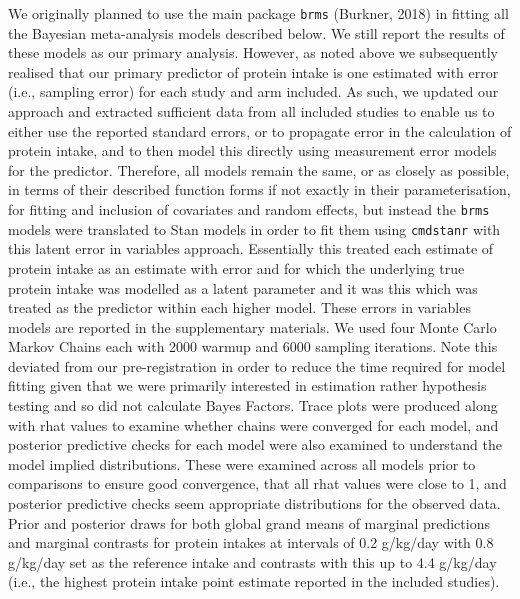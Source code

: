 \documentclass[
]{article}
\begin{document}
We originally planned to use the main package \texttt{brms} (Burkner,
2018) in fitting all the Bayesian meta-analysis models described below.
We still report the results of these models as our primary analysis.
However, as noted above we subsequently realised that our primary
predictor of protein intake is one estimated with error (i.e., sampling
error) for each study and arm included. As such, we updated our approach
and extracted sufficient data from all included studies to enable us to
either use the reported standard errors, or to propagate error in the
calculation of protein intake, and to then model this directly using
measurement error models for the predictor. Therefore, all models remain
the same, or as closely as possible, in terms of their described
function forms if not exactly in their parameterisation, for fitting and
inclusion of covariates and random effects, but instead the
\texttt{brms} models were translated to Stan models in order to fit them
using \texttt{cmdstanr} with this latent error in variables approach.
Essentially this treated each estimate of protein intake as an estimate
with error and for which the underlying true protein intake was modelled
as a latent parameter and it was this which was treated as the predictor
within each higher model. These errors in variables models are reported
in the supplementary materials. We used four Monte Carlo Markov Chains
each with 2000 warmup and 6000 sampling iterations. Note this deviated
from our pre-registration in order to reduce the time required for model
fitting given that we were primarily interested in estimation rather
hypothesis testing and so did not calculate Bayes Factors. Trace plots
were produced along with rhat values to examine whether chains were
converged for each model, and posterior predictive checks for each model
were also examined to understand the model implied distributions. These
were examined across all models prior to comparisons to ensure good
convergence, that all rhat values were close to 1, and posterior
predictive checks seem appropriate distributions for the observed data.
Prior and posterior draws for both global grand means of marginal
predictions and marginal contrasts for protein intakes at intervals of
0.2 g/kg/day with 0.8 g/kg/day set as the reference intake and contrasts
with this up to 4.4 g/kg/day (i.e., the highest protein intake point
estimate reported in the included studies).
\end{document}
